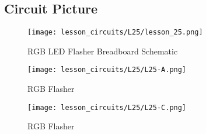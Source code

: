 \subsection{Circuit Picture}
\begin{figure}[htp]
    \centering
    \texttt{[image: lesson\_circuits/L25/lesson\_25.png]}
    \caption{RGB LED Flasher Breadboard Schematic}
    \label{fig:555_rgb_sch}
\end{figure}
\begin{figure}[htp]
    \centering
    \texttt{[image: lesson\_circuits/L25/L25-A.png]}
    \caption{RGB Flasher}
    \label{fig:555_rgb_obb}
\end{figure}
\begin{figure}[htp]
    \centering
    \texttt{[image: lesson\_circuits/L25/L25-C.png]}
    \caption{RGB Flasher}
    \label{fig:555_rgb_obb1}
\end{figure}